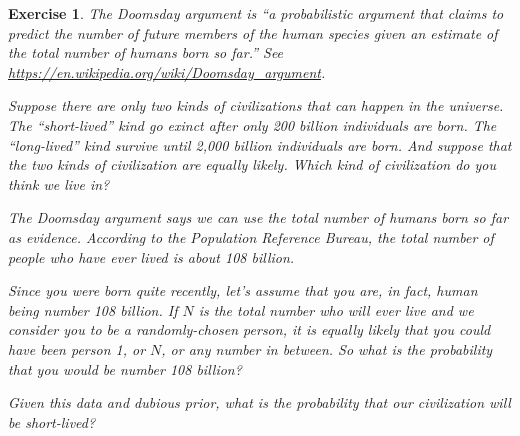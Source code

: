 \documentclass[12pt]{book}
\theoremstyle{exercise}
\newtheorem{exercise}{Exercise}[chapter]
\begin{document}
\begin{exercise}
The Doomsday argument is ``a probabilistic argument that claims to predict the number of future members of the human species given an estimate of the total number of humans born so far.''  See \url{https://en.wikipedia.org/wiki/Doomsday_argument}.

Suppose there are only two kinds of civilizations that can happen in the universe. The ``short-lived'' kind go exinct after only 200 billion individuals are born. The ``long-lived'' kind survive until 2,000 billion individuals are born. And suppose that the two kinds of civilization are equally likely.  Which kind of civilization do you think we live in? 

The Doomsday argument says we can use the total number of humans born so far as evidence.
According to the Population Reference Bureau, the total number of people who have ever lived is about 108 billion. 

Since you were born quite recently, let's assume that you are, in fact, human being number 108 billion.
If $N$ is the total number who will ever live and we consider you to be a randomly-chosen person, it is equally likely that you could have been person 1, or $N$, or any number in between.
So what is the probability that you would be number 108 billion?

Given this data and dubious prior, what is the probability that our civilization will be short-lived?

\end{exercise}
\end{document}
